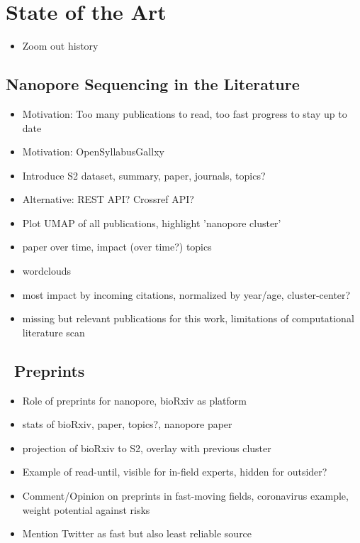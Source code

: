 \chapter{State of the Art}
\label{sec:state_of_art}

\begin{itemize}
    \item Zoom out history \cite{Deamer2016}
\end{itemize}

\section{Nanopore Sequencing in the Literature}

\begin{itemize}
    \item Motivation: Too many publications to read, too fast progress to stay up to date
    \item Motivation: OpenSyllabusGallxy
    \item Introduce S2 dataset, summary, paper, journals, topics?
    \item Alternative: REST API? Crossref API?
    \item Plot UMAP of all publications, highlight 'nanopore cluster'
    \item paper over time, impact (over time?) topics
    \item wordclouds
    \item most impact by incoming citations, normalized by year/age, cluster-center?
    \item missing but relevant publications for this work, limitations of computational literature scan
\end{itemize}

\section{\Biorxiv\ Preprints}

\begin{itemize}
    \item Role of preprints for nanopore, bioRxiv as platform
    \item stats of bioRxiv, paper, topics?, nanopore paper
    \item projection of bioRxiv to S2, overlay with previous cluster
    \item Example of read-until, visible for in-field experts, hidden for outsider?
    \item Comment/Opinion on preprints in fast-moving fields, coronavirus example, weight potential against risks
    \item Mention Twitter as fast but also least reliable source
\end{itemize}

